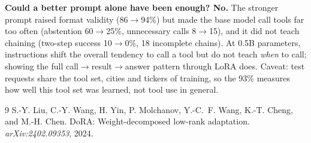 \documentclass[10pt,a4paper]{article}
\begin{document}
\textbf{Could a better prompt alone have been enough? No.}
The stronger prompt raised format validity (86$\to$94\%) but made the base model call tools far too often (abstention 60$\to$25\%, unnecessary calls 8$\to$15), and it did not teach chaining (two-step success 10$\to$0\%, 18 incomplete chains).
At 0.5B parameters, instructions shift the overall tendency to call a tool but do not teach \emph{when} to call; showing the full call$\to$result$\to$answer pattern through LoRA does.
Caveat: test requests share the tool set, cities and tickers of training, so the 93\% measures how well this tool set was learned, not tool use in general.

\normalsize
\begin{thebibliography}{9}\small
   S.-Y. Liu, C.-Y. Wang, H. Yin, P. Molchanov, Y.-C.~F. Wang, K.-T. Cheng, and M.-H. Chen.
    DoRA: Weight-decomposed low-rank adaptation. \emph{arXiv:2402.09353}, 2024.
\end{thebibliography}
\end{document}
